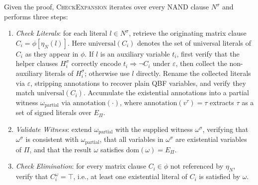 \documentclass{article}
\begin{document}
Given the proof, \textsc{CheckExpansion} iterates over every NAND clause $N^\sigma$
and performs three steps:
\begin{enumerate}
    \item \emph{Check Literals}: for each literal $l \in N^\sigma$, retrieve the
          originating matrix clause $C_i = \phi[\eta_N(l)]$. Here $\mathrm{universal}
              (C_i)$ denotes the set of universal literals of $C_i$ as they appear in
          $\phi$. If $l$ is an auxiliary variable $t_i$, first verify that the helper
          clauses $H_i^\sigma$ correctly encode $t_i \Rightarrow \neg C_i$ under
          $\varepsilon$, then collect the non-auxiliary literals of $H_i^\sigma$;
          otherwise use $l$ directly. Rename the collected literals via $\varepsilon$,
          stripping annotations to recover plain QBF variables, and verify they match
          $\mathrm{universal}(C_i)$. Accumulate the existential annotations into a
          partial witness $\omega_{\mathrm{partial}}$ via $\mathrm{annotation}(\cdot)$,
          where $\mathrm{annotation}(v^\tau) = \tau$ extracts $\tau$ as a set of signed
          literals over $E_\Pi$.
    \item \emph{Validate Witness}: extend $\omega_{\mathrm{partial}}$ with the
          supplied witness $\omega^\sigma$, verifying that $\omega^\sigma$ is
          consistent with $\omega_{\mathrm{partial}}$, that all variables in
          $\omega^\sigma$ are existential variables of $\Pi$, and that the result
          $\omega$ satisfies $\mathrm{dom}(\omega) = E_\Pi$.
    \item \emph{Check Elimination}: for every matrix clause $C_i \in \phi$ not
          referenced by $\eta_N$, verify that $C_i^{\omega} = \top$, i.e., at
          least one existential literal of $C_i$ is satisfied by $\omega$.
\end{enumerate}
\end{document}
